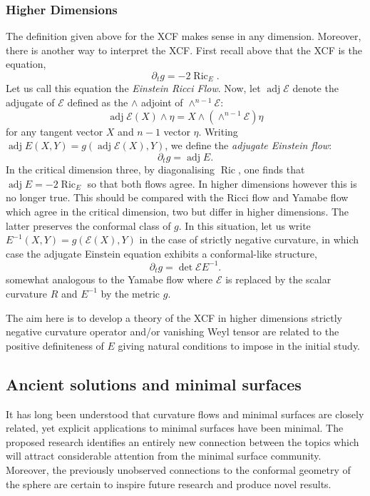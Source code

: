\documentclass[12pt]{amsart}
\begin{document}
\subsubsection*{Higher Dimensions}
\label{sec-3-4-3}

The definition given above for the XCF makes sense in any dimension. Moreover, there is another way to interpret the XCF. First recall above that the XCF is the equation,
\[
\partial_t g = -2 \operatorname{Ric}_E.
\]
Let us call this equation the \emph{Einstein Ricci Flow}. Now, let $\operatorname{adj} \mathcal{E}$ denote the adjugate of $\mathcal{E}$ defined as the $\wedge$ adjoint of $\wedge^{n-1} \mathcal{E}$:
\[
\operatorname{adj} \mathcal{E} (X) \wedge \eta = X \wedge (\wedge^{n-1} \mathcal{E}) \eta
\]
for any tangent vector $X$ and $n-1$ vector $\eta$. Writing $\operatorname{adj} E (X, Y) = g(\operatorname{adj} \mathcal{E} (X), Y)$, we define the \emph{adjugate Einstein flow}:
\[
\partial_t g = \operatorname{adj} E.
\]
In the critical dimension three, by diagonalising $\operatorname{Ric}$, one finds that $\operatorname{adj} E = -2\operatorname{Ric}_E$ so that both flows agree. In higher dimensions however this is no longer true. This should be compared with the Ricci flow and Yamabe flow which agree in the critical dimension, two but differ in higher dimensions. The latter preserves the conformal class of $g$. In this situation, let us write $E^{-1}(X, Y) = g(\mathcal{E} (X), Y)$ in the case of strictly negative curvature, in which case the adjugate Einstein equation exhibits a conformal-like structure,
\[
\partial_t g = \det \mathcal{E} E^{-1}.
\]
somewhat analogous to the Yamabe flow where $\mathcal{E}$ is replaced by the scalar curvature $R$ and $E^{-1}$ by the metric $g$.

The aim here is to develop a theory of the XCF in higher dimensions strictly negative curvature operator and/or vanishing Weyl tensor are related to the positive definiteness of $E$ giving natural conditions to impose in the initial study.

\subsection*{Ancient solutions and minimal surfaces}
\label{sec-3-5}

It has long been understood that curvature flows and minimal surfaces are closely related, yet explicit applications to minimal surfaces have been minimal. The proposed research identifies an entirely new connection between the topics which will attract considerable attention from the minimal surface community. Moreover, the previously unobserved connections to the conformal geometry of the sphere are certain to inspire future research and produce novel results.
\end{document}
